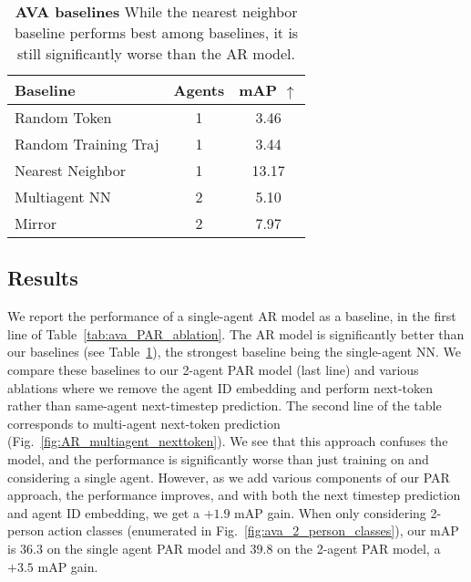 \begin{table}
% 
\centering
\begin{tabular}{@{}lcc@{}}
\toprule
Baseline & Agents &  mAP $\uparrow$           \\
\midrule
Random Token         & 1 & 3.46          \\
Random Training Traj  & 1   & 3.44          \\
Nearest Neighbor    & 1        & 13.17 \\
Multiagent NN &2      & 5.10      \\
Mirror   & 2 & 7.97         \\
\bottomrule
\end{tabular}
\caption{\textbf{AVA baselines} While the nearest neighbor baseline performs best among baselines, it is still significantly worse than the AR model.}
\label{tab:ava_baselines}
\vspace{-.5cm}
\end{table}

\subsection{Results}

We report the performance of a single-agent AR model as a baseline, in the first line of Table~\ref{tab:ava_PAR_ablation}. The AR model is significantly better than our baselines (see Table~\ref{tab:ava_baselines}), the strongest baseline being the single-agent NN. We compare these baselines to our 2-agent PAR model (last line) and various ablations where we remove the agent ID embedding and perform next-token rather than same-agent next-timestep prediction. The second line of the table corresponds to multi-agent next-token prediction (Fig.~\ref{fig:AR_multiagent_nexttoken}). We see that this approach confuses the model, and the performance is significantly worse than just training on and considering a single agent. However, as we add various components of our PAR approach, the performance improves, and with both the next timestep prediction and agent ID embedding, we get a $+1.9$ mAP gain. When only considering 2-person action classes (enumerated in Fig.~\ref{fig:ava_2_person_classes}), our mAP is  $36.3$ on the single agent PAR model and $39.8$ on the 2-agent PAR model, a \textbf{$+3.5$} mAP gain.


